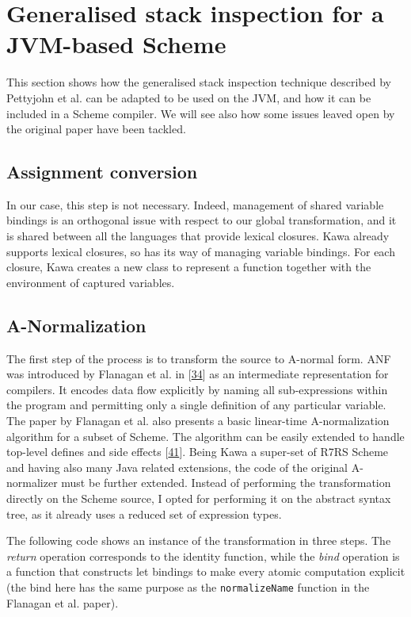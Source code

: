 \documentclass[12pt,a4paper,oneside,openright]{book}
\begin{document}
\section{Generalised stack inspection for a JVM-based
Scheme}\label{generalised-stack-inspection-for-a-jvm-based-scheme}

This section shows how the generalised stack inspection technique
described by Pettyjohn et al. can be adapted to be used on the JVM, and
how it can be included in a Scheme compiler. We will see also how some
issues leaved open by the original paper have been tackled.

\subsection{Assignment conversion}\label{assignment-conversion}

In our case, this step is not necessary. Indeed, management of shared
variable bindings is an orthogonal issue with respect to our global
transformation, and it is shared between all the languages that provide
lexical closures. Kawa already supports lexical closures, so has its way
of managing variable bindings. For each closure, Kawa creates a new
class to represent a function together with the environment of captured
variables.

\subsection{A-Normalization}\label{a-normalization}

The first step of the process is to transform the source to A-normal
form. ANF was introduced by Flanagan et al. in
{[}\hyperref[ref-Flanagan1993]{34}{]} as an intermediate representation
for compilers. It encodes data flow explicitly by naming all
sub-expressions within the program and permitting only a single
definition of any particular variable. The paper by Flanagan et al. also
presents a basic linear-time A-normalization algorithm for a subset of
Scheme. The algorithm can be easily extended to handle top-level defines
and side effects {[}\hyperref[ref-ANFMight2015]{41}{]}. Being Kawa a
super-set of R7RS Scheme and having also many Java related extensions,
the code of the original A-normalizer must be further extended. Instead
of performing the transformation directly on the Scheme source, I opted
for performing it on the abstract syntax tree, as it already uses a
reduced set of expression types.

The following code shows an instance of the transformation in three
steps. The \emph{return} operation corresponds to the identity function,
while the \emph{bind} operation is a function that constructs let
bindings to make every atomic computation explicit (the bind here has
the same purpose as the \texttt{normalizeName} function in the Flanagan
et al. paper).
\end{document}

